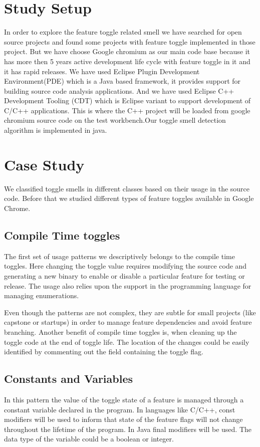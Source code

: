 \documentclass[conference]{IEEEtran}
\begin{document}
\section{Study Setup}
\label{study-setup}
In order to explore the feature toggle related smell we have searched for open source projects and found some projects with feature toggle implemented in those project. But we have choose Google chromium as our main code base because it has more then 5 years active development life cycle with feature toggle in it and it has rapid releases. We have used Eclipse Plugin Development Environment(PDE) which is a Java based framework, it provides support for building source code analysis applications. And we have used Eclipse C++ Development Tooling (CDT) which is Eclipse variant to support development of C/C++ applications. This is where the C++ project will be loaded from google chromium source code on the test workbench.Our toggle smell detection algorithm is implemented in java. 
\section{Case Study}
\label{results}
We classified toggle smells in different classes based on their usage in 
the source code. Before that we studied different types of feature toggles 
available in Google Chrome.

\subsection{Compile Time toggles}
The first set of usage patterns we descriptively belongs to the compile 
time toggles. Here changing the toggle value requires modifying the source 
code and generating a new binary to enable or disable a particular feature 
for testing or release. The usage also relies upon the support in the 
programming language for managing enumerations. 

Even though the patterns are not complex, they are subtle for small projects (like capstone or startups) in order to manage feature dependencies and 
avoid feature branching. Another benefit of compile time toggles is, when 
cleaning up the toggle code at the end of toggle life. The location of the 
changes could be easily identified by commenting out the field containing the toggle flag.

\subsection{Constants and Variables}
In this pattern the value of the toggle state of a feature is managed through a constant variable declared in the program. In languages like C/C++, const modifiers will be used to inform that state of the feature flags will not change throughout the lifetime of the program. In Java final modifiers will be used. The data type of the variable could be a boolean or integer.\\
\end{document}
